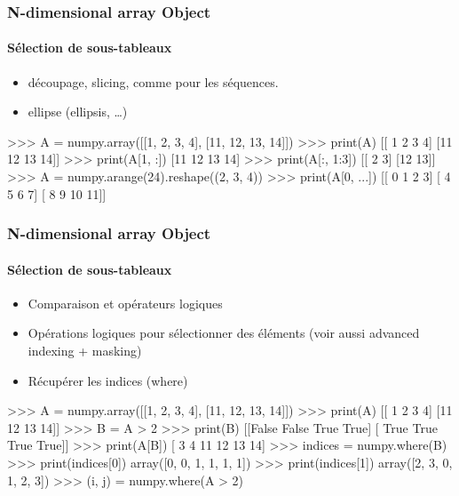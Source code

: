 \begin{frame}[fragile]
\frametitle{N-dimensional array Object}
\framesubtitle{Sélection de sous-tableaux}
\begin{itemize}
 \item découpage, slicing, comme pour les séquences.
 \item ellipse (ellipsis, \dots)
\end{itemize}
\begin{pythonConsole}
>>> A = numpy.array([[1, 2, 3, 4], [11, 12, 13, 14]])
>>> print(A)
[[ 1  2  3  4]
 [11 12 13 14]]
>>> print(A[1, :])
[11 12 13 14]
>>> print(A[:, 1:3])
[[ 2  3]
 [12 13]]
>>> A = numpy.arange(24).reshape((2, 3, 4))
>>> print(A[0, ...])
[[ 0  1  2  3]
 [ 4  5  6  7]
 [ 8  9 10 11]]
\end{pythonConsole}
\end{frame}
\begin{frame}[fragile]
\frametitle{N-dimensional array Object}
\framesubtitle{Sélection de sous-tableaux}
\begin{itemize}
 \item Comparaison et opérateurs logiques
 \item Opérations logiques pour sélectionner des éléments (voir aussi advanced indexing + masking)
 \item Récupérer les indices (where)
\end{itemize}
\begin{pythonConsole}
>>> A = numpy.array([[1, 2, 3, 4], [11, 12, 13, 14]])
>>> print(A)
[[ 1  2  3  4]
 [11 12 13 14]]
>>> B = A > 2
>>> print(B)
[[False False  True  True]
 [ True  True  True  True]]
>>> print(A[B])
[ 3  4 11 12 13 14]
>>> indices = numpy.where(B)
>>> print(indices[0])
array([0, 0, 1, 1, 1, 1])
>>> print(indices[1])
array([2, 3, 0, 1, 2, 3])
>>> (i, j) = numpy.where(A > 2)
\end{pythonConsole}
\end{frame}
